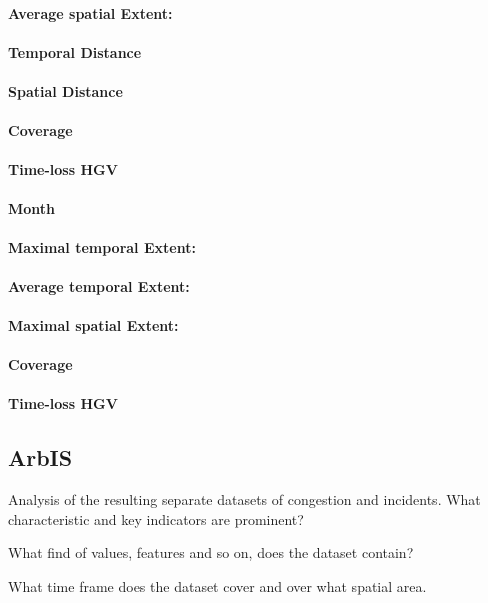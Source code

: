 \begin{table}[ht]
\paragraph{Average spatial Extent:}
\paragraph{Temporal Distance}
\paragraph{Spatial Distance}
\paragraph{Coverage}
\paragraph{Time-loss HGV}

\large
\centerline{\textbf{Month}}
\normalsize

\paragraph{Maximal temporal Extent:}
\paragraph{Average temporal Extent:}
\paragraph{Maximal spatial Extent:}
\paragraph{Coverage}
\paragraph{Time-loss HGV}

\subsection{ArbIS}

Analysis of the resulting separate datasets of congestion and incidents. What characteristic and key indicators are prominent?

What find of values, features and so on, does the dataset contain?

What time frame does the dataset cover and over what spatial area.


\end{table}
